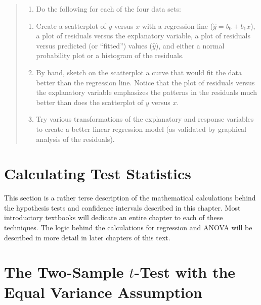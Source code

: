 \documentclass[
]{report}
\providecommand{\tightlist}{%
  \setlength{\itemsep}{0pt}\setlength{\parskip}{0pt}}
\begin{document}
\begin{quote}
\begin{enumerate}
\def\labelenumi{\arabic{enumi}.}
\setcounter{enumi}{32}
\tightlist
\item
  Do the following for each of the four data sets:\\
\end{enumerate}

\begin{enumerate}
\def\labelenumi{\alph{enumi}.}
\tightlist
\item
  Create a scatterplot of \(y\) versus \(x\) with a regression line (\(\hat{y} = b_0 + b_1 x\)), a plot of residuals versus the explanatory variable, a plot of residuals versus predicted (or ``fitted'') values (\(\hat{y}\)), and either a normal probability plot or a histogram of the residuals.\\
\item
  By hand, sketch on the scatterplot a curve that would fit the data better than the regression line. Notice that the plot of residuals versus the explanatory variable emphasizes the patterns in the residuals much better than does the scatterplot of \(y\) versus \(x\).\\
\item
  Try various transformations of the explanatory and response variables to create a better linear regression model (as validated by graphical analysis of the residuals).
\end{enumerate}
\end{quote}

\hypertarget{calculating-test-statistics}{%
\section{\texorpdfstring{\textbf{Calculating Test Statistics}}{Calculating Test Statistics}}\label{calculating-test-statistics}}

This section is a rather terse description of the mathematical calculations behind the hypothesis tests and confidence intervals described in this chapter. Most introductory textbooks will dedicate an entire chapter to each of these techniques. The logic behind the calculations for regression and ANOVA will be described in more detail in later chapters of this text.

\hypertarget{the-two-sample-t-test-with-the-equal-variance-assumption}{%
\section*{\texorpdfstring{The Two-Sample \(t\)-Test with the Equal Variance Assumption}{The Two-Sample t-Test with the Equal Variance Assumption}}\label{the-two-sample-t-test-with-the-equal-variance-assumption}}
\end{document}
